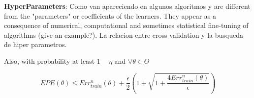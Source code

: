 \textbf{HyperParameters}:
Como van apareciendo en algunos algoritmos y are different from the "parameters" or coefficients of the learners. They appear as a consequence of numerical, computational and sometimes statistical fine-tuning of algorithms (give an example?). 
La relacion entre cross-validation y la busqueda de hiper parametros. 

\textit{}

\textit{} 



Also, with probability at least $1 - \eta$ and $\forall \theta \in \Theta$

\begin{equation}\label{vapnik-classificationBound}
EPE(\theta) \leq  Err^n_{train}(\theta) + \frac{\epsilon}{2} \left(1 + \sqrt{1 + \frac{4 Err^n_{train}(\theta)  }{\epsilon}}  \right)    
\end{equation}

